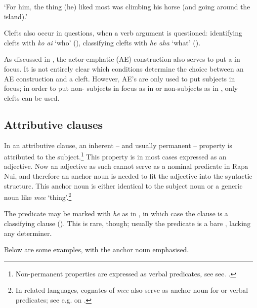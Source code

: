 \glt 
‘For him, the thing (he) liked most was climbing his horse (and going around the island).’ \textstyleExampleref{[R439.008]} 
\z
{}

Clefts also occur in questions, when a verb argument is questioned: identifying clefts with \textit{ko ai} ‘who’ (), classifying clefts with \textit{he aha} ‘what’ ().

As discussed in , the actor-emphatic (AE) construction also serves to put a  in focus. It is not entirely clear which conditions determine the choice between an AE construction and a cleft. However, AE’s are only used to put  subjects in focus; in order to put non- subjects in focus as in  or non-subjects as in , only clefts can be used.

\subsection{Attributive clauses}\label{sec:9.2.7}
In an attributive clause, an inherent – and usually permanent – property is attributed to the subject.\footnote{\label{fn:470}Non-permanent properties are expressed as verbal predicates, see sec. .} This property is in most cases expressed as an adjective. Now an adjective as such cannot serve as a nominal predicate in Rapa Nui, and therefore an anchor noun is needed to fit the adjective into the syntactic structure. This anchor noun is either identical to the subject noun or a generic noun like \textit{me{\ꞌ}e} ‘thing’.\footnote{\label{fn:471}In related languages, cognates of \textit{me{\ꞌ}e} also serve as anchor noun for  or verbal predicates; see e.g. \citet[38]{LazardPeltzer2000} on .} 

The predicate may be marked with \textit{he} as in , in which case the clause is a classifying clause (). This is rare, though; usually the predicate is a bare , lacking any determiner.

Below are some examples, with the anchor noun emphasised.

